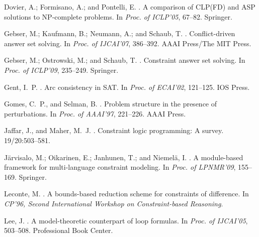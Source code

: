 \documentclass[letterpaper]{article}
\begin{document}
\begin{thebibliography}{}
Dovier, A.; Formisano, A.; and Pontelli, E.
.
\newblock A comparison of {CLP(FD)} and {ASP} solutions to {NP}-complete
  problems.
\newblock In {\em Proc. of ICLP'05},  67--82.
\newblock Springer.

Gebser, M.; Kaufmann, B.; Neumann, A.; and Schaub, T.
.
\newblock Conflict-driven answer set solving.
\newblock In {\em Proc. of IJCAI'07},  386--392.
\newblock AAAI Press/The MIT Press.

Gebser, M.; Ostrowski, M.; and Schaub, T.
.
\newblock Constraint answer set solving.
\newblock In {\em Proc. of ICLP'09},  235--249.
\newblock Springer.

Gent, I.~P.
.
\newblock Arc consistency in {SAT}.
\newblock In {\em Proc. of ECAI'02},  121--125.
\newblock IOS Press.

Gomes, C.~P., and Selman, B.
.
\newblock Problem structure in the presence of perturbations.
\newblock In {\em Proc. of AAAI'97},  221--226.
\newblock AAAI Press.

Jaffar, J., and Maher, M.~J.
.
\newblock Constraint logic programming: A survey.
 19/20:503--581.

J{\"a}rvisalo, M.; Oikarinen, E.; Janhunen, T.; and Niemel{\"a}, I.
.
\newblock A module-based framework for multi-language constraint modeling.
\newblock In {\em Proc. of LPNMR'09},  155--169.
\newblock Springer.

Leconte, M.
.
\newblock A bounds-based reduction scheme for constraints of difference.
\newblock In {\em CP'96, Second International Workshop on Constraint-based
  Reasoning}.

Lee, J.
.
\newblock A model-theoretic counterpart of loop formulas.
\newblock In {\em Proc. of IJCAI'05},  503--508.
\newblock Professional Book Center.


\end{thebibliography}
\end{document}
